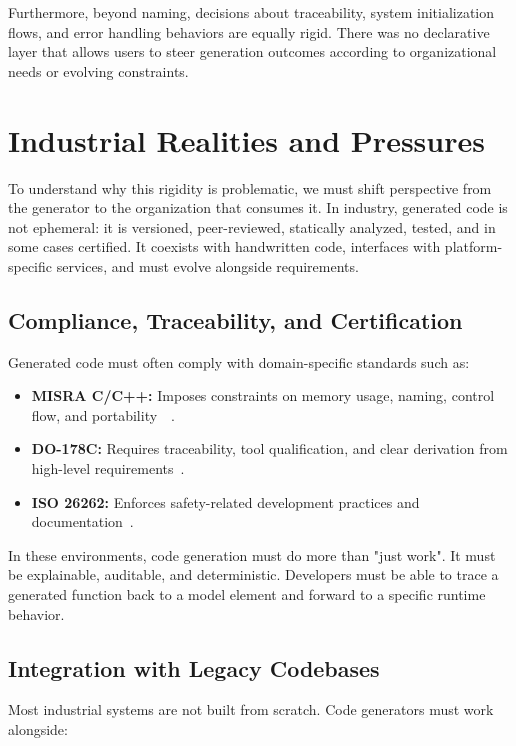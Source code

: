 Furthermore, beyond naming, decisions about traceability, system initialization flows, and error handling behaviors are equally rigid. There was no declarative layer that allows users to steer generation outcomes according to organizational needs or evolving constraints. 

\section{Industrial Realities and Pressures}
\label{sec:industrial_realities}

To understand why this rigidity is problematic, we must shift perspective from the generator to the organization that consumes it. In industry, generated code is not ephemeral: it is versioned, peer-reviewed, statically analyzed, tested, and in some cases certified. It coexists with handwritten code, interfaces with platform-specific services, and must evolve alongside requirements.

\subsection{Compliance, Traceability, and Certification}

Generated code must often comply with domain-specific standards such as:

\begin{itemize}
	\item \textbf{\gls{MISRA} C/C++:} Imposes constraints on memory usage, naming, control flow, and portability~\cite{Misra_C_2025}~\cite{Misra_Cpp_2023}.
	\item \textbf{DO-178C:} Requires traceability, tool qualification, and clear derivation from high-level requirements~\cite{DO}. 
	\item \textbf{\gls{ISO} 26262:} Enforces safety-related development practices and documentation~\cite{Debouk_2019}.
\end{itemize} 

In these environments, code generation must do more than "just work". It must be explainable, auditable, and deterministic. Developers must be able to trace a generated function back to a model element and forward to a specific runtime behavior.

\subsection{Integration with Legacy Codebases}

Most industrial systems are not built from scratch. Code generators must work alongside:

